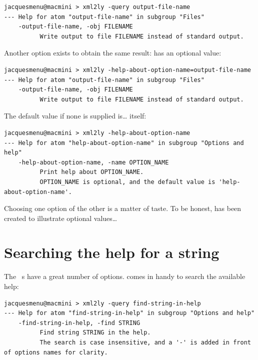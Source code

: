\begin{lstlisting}[language=Terminal]
jacquesmenu@macmini > xml2ly -query output-file-name
--- Help for atom "output-file-name" in subgroup "Files"
    -output-file-name, -obj FILENAME
          Write output to file FILENAME instead of standard output.
\end{lstlisting}

Another option exists to obtain the same result:  has an optional value:
\begin{lstlisting}[language=Terminal]
jacquesmenu@macmini > xml2ly -help-about-option-name=output-file-name
--- Help for atom "output-file-name" in subgroup "Files"
    -output-file-name, -obj FILENAME
          Write output to file FILENAME instead of standard output.
\end{lstlisting}

The default value if none is supplied is\dots {} itself:
\begin{lstlisting}[language=Terminal]
jacquesmenu@macmini > xml2ly -help-about-option-name
--- Help for atom "help-about-option-name" in subgroup "Options and help"
    -help-about-option-name, -name OPTION_NAME
          Print help about OPTION_NAME.
          OPTION_NAME is optional, and the default value is 'help-about-option-name'.
\end{lstlisting}

Choosing one option of the other is a matter of taste. To be honest,  has been created to illustrate optional values\dots


\section{Searching the help for a string}

The \mf\ \service s have a great number of options.  comes in handy to search the available help:
\begin{lstlisting}[language=Terminal]
jacquesmenu@macmini > xml2ly -query find-string-in-help
--- Help for atom "find-string-in-help" in subgroup "Options and help"
    -find-string-in-help, -find STRING
          Find string STRING in the help.
          The search is case insensitive, and a '-' is added in front of options names for clarity.
\end{lstlisting}

